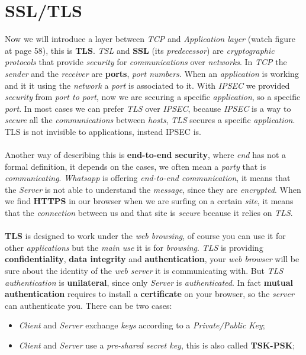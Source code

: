 \documentclass{article}
\begin{document}
\section{SSL/TLS}
Now we will introduce a layer between \emph{TCP} and \emph{Application layer} (watch figure at page 58), this is \textbf{TLS}. \emph{TSL} and \textbf{SSL} (its \emph{predecessor}) are \emph{cryptographic protocols} that provide \emph{security} for \emph{communications} over \emph{networks}. In \emph{TCP} the \emph{sender} and the \emph{receiver} are \textbf{ports}, \emph{port numbers}. When an \emph{application} is working and it it using the \emph{network} a \emph{port} is associated to it. With \emph{IPSEC} we provided \emph{security} from \emph{port to port}, now we are securing a specific \emph{application}, so a specific \emph{port}. In most cases we can prefer \emph{TLS} over \emph{IPSEC}, because \emph{IPSEC} is a way to \emph{secure} all the \emph{communications} between \emph{hosts}, \emph{TLS} secures a specific \emph{application}. TLS is not invisible to applications, instead IPSEC is. \\\\
Another way of describing this is \textbf{end-to-end security}, where \emph{end} has not a formal definition, it depends on the cases, we often mean a \emph{party} that is \emph{communicating}. \emph{Whatsapp} is offering\emph{ end-to-end communication}, it means that the \emph{Server} is not able to understand the \emph{message}, since they are \emph{encrypted}. When we find \textbf{HTTPS} in our browser when we are surfing on a certain \emph{site}, it means that the \emph{connection} between us and that site is \emph{secure} because it relies on \emph{TLS}. \\\\
\textbf{TLS} is designed to work under the\emph{ web browsing}, of course you can use it for other \emph{applications} but the \emph{main use} it is for \emph{browsing}. \emph{TLS} is providing \textbf{confidentiality}, \textbf{data integrity} and \textbf{authentication}, your \emph{web browser} will be sure about the identity of the \emph{web server} it is communicating with. But \emph{TLS authentication} is \textbf{unilateral}, since only \emph{Server} is \emph{authenticated}. In fact \textbf{mutual authentication} requires to install a \textbf{certificate} on your browser, so the \emph{server} can authenticate you. 
\clearpage
There can be two cases:
\begin{itemize}
\item \emph{Client} and \emph{Server} exchange \emph{keys} according to a \emph{Private/Public Key};
\item \emph{Client} and \emph{Server} use a \emph{pre-shared secret key}, this is also called \textbf{TSK-PSK};
\end{itemize}
\end{document}
